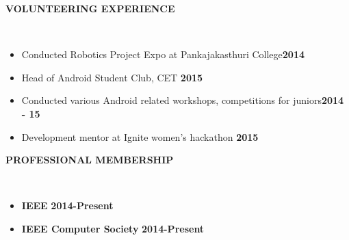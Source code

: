 \documentclass[a4paper,10pt]{article}
\newcommand{\lsep}{-0.5cm}
\newcommand{\resheading}[1]{{\small \colorbox{mygrey}{\begin{minipage}{0.975\textwidth}{\textbf{\uppercase{#1} \vphantom{p\^{E}}}}\end{minipage}}}}
\newcommand{\when}[1]{\hfill \textbf{#1}}
\newenvironment{noSepItemize}
{ \begin{itemize}
    \setlength{\itemsep}{0pt}
    \setlength{\parskip}{0pt}
    \setlength{\parsep}{0pt}     }
{ \end{itemize}                  }
\begin{document}
\resheading{\textbf{Volunteering Experience} }\\[\lsep]
\begin{noSepItemize}
	\item \noindent Conducted Robotics Project Expo at Pankajakasthuri College\when{2014}
	\item \noindent Head of Android Student Club, CET \when{2015}
	\item \noindent Conducted various Android related workshops, competitions for juniors\when{2014 - 15}
	\item \noindent Development mentor at Ignite women's hackathon \when{2015}
\end{noSepItemize}

\resheading{\textbf{Professional Membership} }\\[\lsep]
\begin{noSepItemize}
	\item \noindent \textbf{IEEE} \when{2014-Present}
	\item \noindent \textbf{IEEE Computer Society} \when{2014-Present}
\end{noSepItemize}
\end{document}
